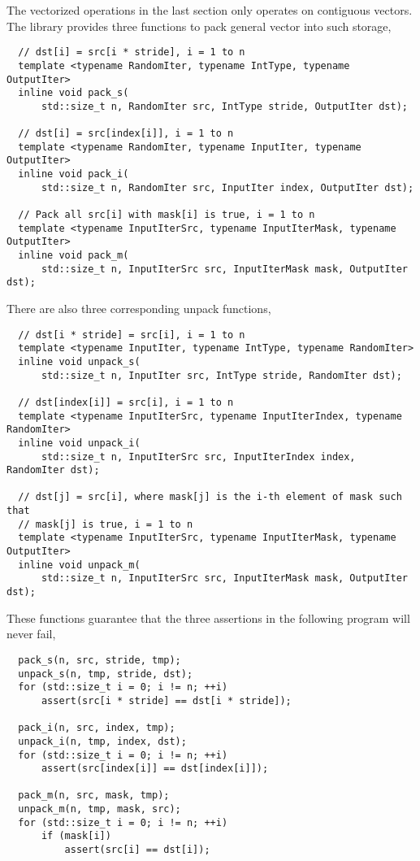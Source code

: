 The vectorized operations in the last section only operates on contiguous
vectors. The library provides three functions to pack general vector into such
storage,
\begin{Verbatim}
  // dst[i] = src[i * stride], i = 1 to n
  template <typename RandomIter, typename IntType, typename OutputIter>
  inline void pack_s(
      std::size_t n, RandomIter src, IntType stride, OutputIter dst);

  // dst[i] = src[index[i]], i = 1 to n
  template <typename RandomIter, typename InputIter, typename OutputIter>
  inline void pack_i(
      std::size_t n, RandomIter src, InputIter index, OutputIter dst);

  // Pack all src[i] with mask[i] is true, i = 1 to n
  template <typename InputIterSrc, typename InputIterMask, typename OutputIter>
  inline void pack_m(
      std::size_t n, InputIterSrc src, InputIterMask mask, OutputIter dst);
\end{Verbatim}
There are also three corresponding unpack functions,
\begin{Verbatim}
  // dst[i * stride] = src[i], i = 1 to n
  template <typename InputIter, typename IntType, typename RandomIter>
  inline void unpack_s(
      std::size_t n, InputIter src, IntType stride, RandomIter dst);

  // dst[index[i]] = src[i], i = 1 to n
  template <typename InputIterSrc, typename InputIterIndex, typename RandomIter>
  inline void unpack_i(
      std::size_t n, InputIterSrc src, InputIterIndex index, RandomIter dst);

  // dst[j] = src[i], where mask[j] is the i-th element of mask such that
  // mask[j] is true, i = 1 to n
  template <typename InputIterSrc, typename InputIterMask, typename OutputIter>
  inline void unpack_m(
      std::size_t n, InputIterSrc src, InputIterMask mask, OutputIter dst);
\end{Verbatim}
These functions guarantee that the three assertions in the following program
will never fail,
\begin{Verbatim}
  pack_s(n, src, stride, tmp);
  unpack_s(n, tmp, stride, dst);
  for (std::size_t i = 0; i != n; ++i)
      assert(src[i * stride] == dst[i * stride]);

  pack_i(n, src, index, tmp);
  unpack_i(n, tmp, index, dst);
  for (std::size_t i = 0; i != n; ++i)
      assert(src[index[i]] == dst[index[i]]);

  pack_m(n, src, mask, tmp);
  unpack_m(n, tmp, mask, src);
  for (std::size_t i = 0; i != n; ++i)
      if (mask[i])
          assert(src[i] == dst[i]);
\end{Verbatim}
